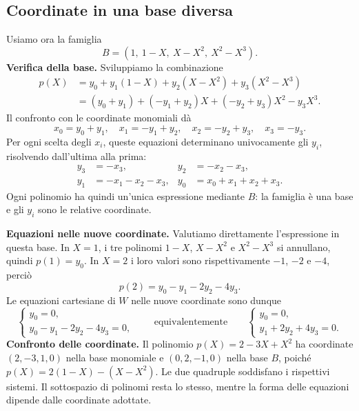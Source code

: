 \subsection{Coordinate in una base diversa}
\begin{svolgimento}
Usiamo ora la famiglia
\[
  B=(1,\ 1-X,\ X-X^2,\ X^2-X^3).
\]
\textbf{Verifica della base.} Sviluppiamo la combinazione
\begin{align*}
  p(X)&=y_0+y_1(1-X)+y_2(X-X^2)+y_3(X^2-X^3)\\
      &=(y_0+y_1)+(-y_1+y_2)X+(-y_2+y_3)X^2-y_3X^3.
\end{align*}
Il confronto con le coordinate monomiali dà
\[
  x_0=y_0+y_1,\quad x_1=-y_1+y_2,\quad
  x_2=-y_2+y_3,\quad x_3=-y_3.
\]
Per ogni scelta degli $x_i$, queste equazioni determinano univocamente gli $y_i$, risolvendo dall'ultima alla prima:
\[
  \begin{aligned}
    y_3&=-x_3,& y_2&=-x_2-x_3,\\
    y_1&=-x_1-x_2-x_3,& y_0&=x_0+x_1+x_2+x_3.
  \end{aligned}
\]
Ogni polinomio ha quindi un'unica espressione mediante $B$: la famiglia è una base e gli $y_i$ sono le relative coordinate.

\textbf{Equazioni nelle nuove coordinate.} Valutiamo direttamente l'espressione in questa base. In $X=1$, i tre polinomi $1-X$, $X-X^2$ e $X^2-X^3$ si annullano, quindi $p(1)=y_0$. In $X=2$ i loro valori sono rispettivamente $-1$, $-2$ e $-4$, perciò
\[
  p(2)=y_0-y_1-2y_2-4y_3.
\]
Le equazioni cartesiane di $W$ nelle nuove coordinate sono dunque
\[
  \begin{cases}
    y_0=0,\\
    y_0-y_1-2y_2-4y_3=0,
  \end{cases}
  \qquad\text{equivalentemente}\qquad
  \begin{cases}
    y_0=0,\\
    y_1+2y_2+4y_3=0.
  \end{cases}
\]
\textbf{Confronto delle coordinate.} Il polinomio $p(X)=2-3X+X^2$ ha coordinate $(2,-3,1,0)$ nella base monomiale e $(0,2,-1,0)$ nella base $B$, poiché $p(X)=2(1-X)-(X-X^2)$. Le due quadruple soddisfano i rispettivi sistemi. Il sottospazio di polinomi resta lo stesso, mentre la forma delle equazioni dipende dalle coordinate adottate.
\end{svolgimento}

